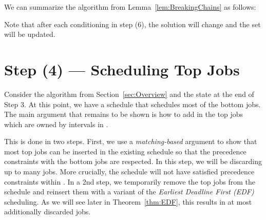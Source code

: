 \documentclass[11pt,letterpaper,oneside,english]{article}
\theoremstyle{theorem}
\begin{document}
We can summarize the algorithm from Lemma~\ref{lem:BreakingChains} as follows: 
\begin{center}
\end{center}
Note that after each conditioning in step (6), the solution  will change and the 
set  will be updated. 




\section{Step (4) --- Scheduling Top Jobs}\label{sec:SchedulingTopJobs}


Consider the algorithm from Section~\ref{sec:Overview} and the state at the end of
Step 3. At this point, we have a schedule  that schedules most of the bottom jobs.
The main argument that remains to be shown is how to add in the top jobs
which are owned by intervals in .


This is done in two steps.
First, we use a \emph{matching-based} argument to show that most top jobs can be inserted 
in the existing schedule so that
the precedence constraints with the bottom jobs are respected. In this step, we will be 
discarding up to   many jobs. More crucially, the schedule
will not have satisfied precedence constraints within .
In a 2nd step, we temporarily remove the top jobs from the schedule and reinsert them 
with a variant of the \emph{Earliest Deadline First (EDF)} scheduling. As we will see later in Theorem~\ref{thm:EDF}, this results in at most 
  additionally discarded jobs. 
\end{document}
